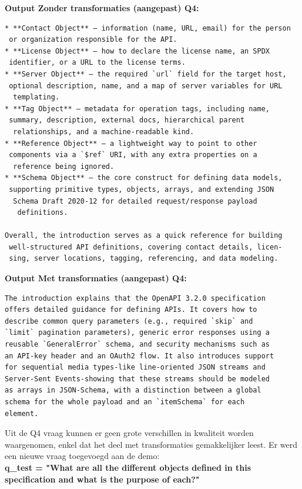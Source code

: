 \begin{tcolorbox}[colback=gray!20, colframe=gray!80]
\textbf{Output Zonder transformaties (aangepast) Q4:}
\begin{verbatim}
* **Contact Object** – information (name, URL, email) for the person
 or organization responsible for the API.  
* **License Object** – how to declare the license name, an SPDX
 identifier, or a URL to the license terms.  
* **Server Object** – the required `url` field for the target host,
 optional description, name, and a map of server variables for URL
  templating.  
* **Tag Object** – metadata for operation tags, including name,
 summary, description, external docs, hierarchical parent
  relationships, and a machine‑readable kind.  
* **Reference Object** – a lightweight way to point to other
 components via a `$ref` URI, with any extra properties on a
  reference being ignored.  
* **Schema Object** – the core construct for defining data models,
 supporting primitive types, objects, arrays, and extending JSON
  Schema Draft 2020‑12 for detailed request/response payload
   definitions.

Overall, the introduction serves as a quick reference for building
 well-structured API definitions, covering contact details, licen-
 sing, server locations, tagging, referencing, and data modeling.
\end{verbatim}
\end{tcolorbox}

\begin{tcolorbox}[colback=gray!20, colframe=gray!80]
\textbf{Output Met transformaties (aangepast) Q4:}
\begin{verbatim}
The introduction explains that the OpenAPI 3.2.0 specification
offers detailed guidance for defining APIs. It covers how to
describe common query parameters (e.g., required `skip` and
`limit` pagination parameters), generic error responses using a
reusable `GeneralError` schema, and security mechanisms such as
an API-key header and an OAuth2 flow. It also introduces support
for sequential media types-like line-oriented JSON streams and
Server-Sent Events-showing that these streams should be modeled
as arrays in JSON-Schema, with a distinction between a global
schema for the whole payload and an `itemSchema` for each
element.
\end{verbatim}
\end{tcolorbox}

Uit de Q4 vraag kunnen er geen grote verschillen in kwaliteit worden waargenomen, enkel dat het deel met transformaties gemakkelijker leest. Er werd een nieuwe vraag toegevoegd aan de demo: \\
\textbf{q\_test = "What are all the different objects defined in this specification and what is the purpose of each?"} \\

